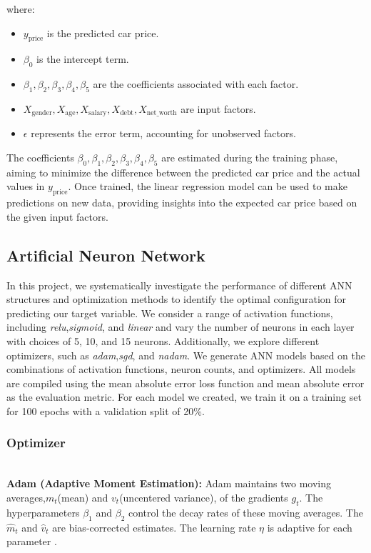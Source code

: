 \documentclass[manuscript,screen,review,nonacm]{acmart}
\begin{document}
where:  
\begin{itemize}
  \item $y_{\text{price}}$ is the predicted car price.
  \item $\beta_0$ is the intercept term.
  \item $\beta_1, \beta_2, \beta_3, \beta_4,\beta_5$ are the coefficients associated with each factor.
  \item $X_{\text{gender}}, X_{\text{age}}, X_{\text{salary}}, X_{\text{debt}}, X_{\text{net\_worth}}$ are input factors.
  \item $\epsilon$ represents the error term, accounting for unobserved factors.
\end{itemize}

The coefficients $\beta_0, \beta_1, \beta_2, \beta_3, \beta_4,\beta_5$ are estimated during the training phase, aiming to minimize the difference between the predicted car price and the actual values in \(y_{\text{price}}\). Once trained, the linear regression model can be used to make predictions on new data, providing insights into the expected car price based on the given input factors.


\subsection{Artificial Neuron Network}

In this project, we systematically investigate the performance of different ANN structures and optimization methods to identify the optimal configuration for predicting our target variable. We consider a range of activation functions, including {\it relu},{\it sigmoid}, and {\it linear} and vary the number of neurons in each layer with choices of 5, 10, and 15 neurons. Additionally, we explore different optimizers, such as {\it adam},{\it sgd}, and {\it nadam}. We generate ANN models based on the combinations of activation functions, neuron counts, and optimizers. All models are compiled using the mean absolute error loss function and mean absolute error as the evaluation metric. For each model we created, we train it on a training set for 100 epochs with a validation split of 20\%. 


\subsubsection{Optimizer}  
\hfill\\
\textbf{Adam (Adaptive Moment Estimation):} Adam maintains two moving averages,$m_t$(mean) and $v_t$(uncentered variance), of the gradients $g_t$. The hyperparameters $\beta_1$ and $\beta_2$ control the decay rates of these moving averages. The $\hat{m}_t$ and $\hat{v}_t$ are bias-corrected estimates. The learning rate $\eta$ is adaptive for each parameter \citep{kingma2014adam}. 
\end{document}
